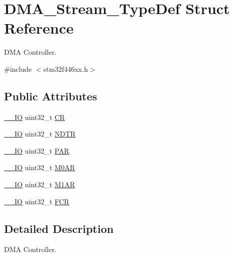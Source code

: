 \hypertarget{struct_d_m_a___stream___type_def}{}\section{D\+M\+A\+\_\+\+Stream\+\_\+\+Type\+Def Struct Reference}
\label{struct_d_m_a___stream___type_def}


D\+MA Controller.  




{\ttfamily \#include $<$stm32f446xx.\+h$>$}

\subsection*{Public Attributes}
\begin{DoxyCompactItemize}
\item 
\hyperlink{core__sc300_8h_aec43007d9998a0a0e01faede4133d6be}{\+\_\+\+\_\+\+IO} uint32\+\_\+t \hyperlink{struct_d_m_a___stream___type_def_af893adc5e821b15d813237b2bfe4378b}{CR}
\item 
\hyperlink{core__sc300_8h_aec43007d9998a0a0e01faede4133d6be}{\+\_\+\+\_\+\+IO} uint32\+\_\+t \hyperlink{struct_d_m_a___stream___type_def_a2cc2a52628182f9e79ab1e49bb78a1eb}{N\+D\+TR}
\item 
\hyperlink{core__sc300_8h_aec43007d9998a0a0e01faede4133d6be}{\+\_\+\+\_\+\+IO} uint32\+\_\+t \hyperlink{struct_d_m_a___stream___type_def_adbeac1d47cb85ab52dac71d520273947}{P\+AR}
\item 
\hyperlink{core__sc300_8h_aec43007d9998a0a0e01faede4133d6be}{\+\_\+\+\_\+\+IO} uint32\+\_\+t \hyperlink{struct_d_m_a___stream___type_def_a965da718db7d0303bff185d367d96fd6}{M0\+AR}
\item 
\hyperlink{core__sc300_8h_aec43007d9998a0a0e01faede4133d6be}{\+\_\+\+\_\+\+IO} uint32\+\_\+t \hyperlink{struct_d_m_a___stream___type_def_a142ca5a1145ba9cf4cfa557655af1c13}{M1\+AR}
\item 
\hyperlink{core__sc300_8h_aec43007d9998a0a0e01faede4133d6be}{\+\_\+\+\_\+\+IO} uint32\+\_\+t \hyperlink{struct_d_m_a___stream___type_def_aad3d78ab35e7af48951be5be53392f9f}{F\+CR}
\end{DoxyCompactItemize}


\subsection{Detailed Description}
D\+MA Controller. 

